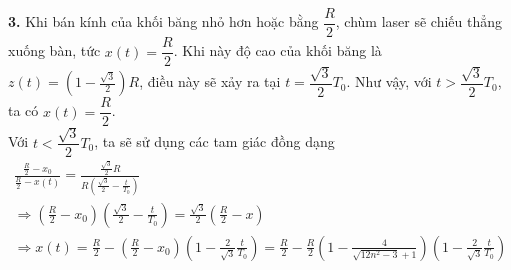 \noindent\textbf{3.} Khi bán kính của khối băng nhỏ hơn hoặc bằng $\dfrac{R}{2}$, chùm laser sẽ chiếu thẳng xuống bàn, tức $x(t)=\dfrac{R}{2}$. Khi này độ cao của khối băng là $z(t)=\left(1-\frac{\sqrt{3}}{2}\right)R$, điều này sẽ xảy ra tại $t=\dfrac{\sqrt{3}}{2}T_0$. Như vậy, với $t>\dfrac{\sqrt{3}}{2}T_0$, ta có $x(t)=\dfrac{R}{2}$.\\
\noindent Với $t<\dfrac{\sqrt{3}}{2}T_0$, ta sẽ sử dụng các tam giác đồng dạng
\begin{equation*}
  \begin{gathered}
    \frac{\frac{R}{2}-x_{0}}{\frac{R}{2}-x(t)}=\frac{\frac{\sqrt{3}}{2}R}{R\left(\frac{\sqrt{3}}{2}-\frac{t}{T_{0}}\right)} \\
    \Rightarrow\left(\frac{R}{2}-x_{0}\right)\left(\frac{\sqrt{3}}{2}-\frac{t}{T_{0}}\right)=\frac{\sqrt{3}}{2}\left(\frac{R}{2}-x\right) \\
    \Rightarrow x(t)=\frac{R}{2}-\left(\frac{R}{2}-x_{0}\right)\left(1-\frac{2}{\sqrt{3}}\frac{t}{T_{0}}\right)=\frac{R}{2}-\frac{R}{2}\left(1-\frac{4}{\sqrt{12n^{2}-3}+1}\right)\left(1-\frac{2}{\sqrt{3}}\frac{t}{T_{0}}\right)
  \end{gathered}
\end{equation*}